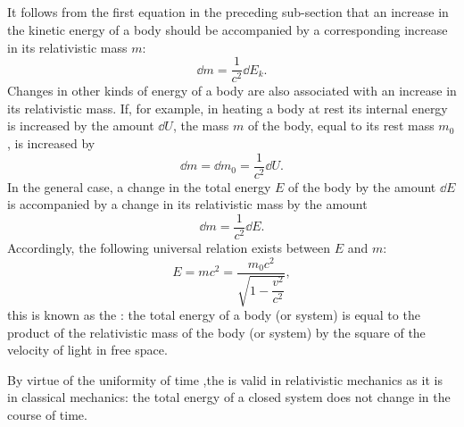 \subsection{}\label{5.7.2} It follows from the first equation in the preceding sub-section that an increase in the kinetic energy of a body should be accompanied by a corresponding increase in its relativistic mass $m$:
\begin{equation*}%
\dd m =  \frac{1}{c^{2}} \dd E_{k}.
\end{equation*}
Changes in other kinds of energy of a body are also associated with an increase in its relativistic mass. If, for example, in heating a body at rest its internal energy  is increased by the amount $\dd U$, the mass $m$ of the body, equal to its rest mass $m_{0}$, is increased by
\begin{equation*}%
\dd m =  \dd m_{0} = \frac{1}{c^{2}} \dd U.
\end{equation*}
In the general case, a change in the total energy $E$ of the body by the amount $\dd E$ is accompanied by a change in its relativistic mass by the amount
\begin{equation*}%
\dd m =  \frac{1}{c^{2}} \dd E.
\end{equation*}
Accordingly, the following universal relation exists between $E$ and $m$:
\begin{equation*}%
E = mc^{2} = \frac{m_{0}c^{2}}{\sqrt{1 - \dfrac{v^{2}}{c^{2}}}},
\end{equation*}
this is known as the : the total energy of a body (or system) is equal to the product of the relativistic mass of the body (or system) by the square of the velocity of light in free space. 

By virtue of the uniformity of time ,the  is valid in relativistic mechanics as it is in classical mechanics: the total energy of a closed system  does not change in the course of time.

